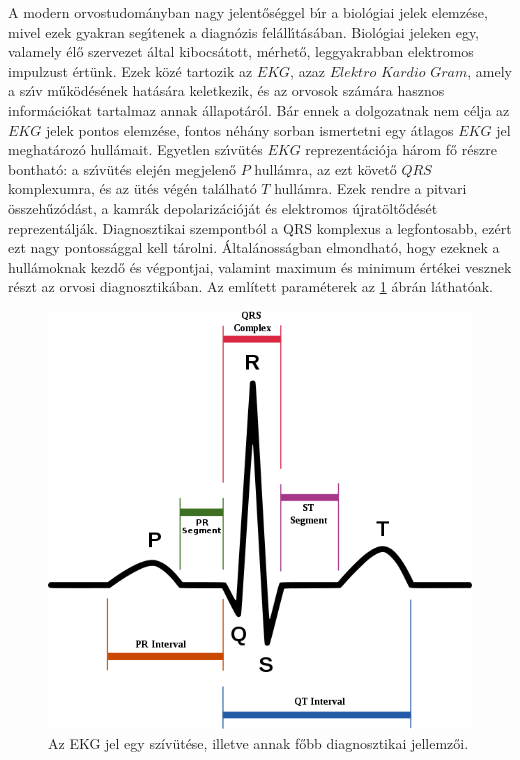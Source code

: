 \documentclass[oneside,titlepage,12pt,a4paper]{report}
\begin{document}
A modern orvostudom\'anyban nagy jelent\H os\'eggel b\'\i r a  biol\'ogiai jelek
elemz\'ese, mivel ezek gyakran seg\'\i tenek a diagn\'ozis fel\'all\'\i t\'as\'aban. Biol\'ogiai
jeleken egy, valamely \'el\H o szervezet \'altal kibocs\'atott, m\'erhet\H o, leggyakrabban elektromos
impulzust \'ert\"unk. Ezek k\"oz\'e tartozik az $EKG$, azaz $Elektro$ $Kardio$ $Gram$,
amely a sz\'\i v m\H uk\"od\'es\'e\-nek hat\'as\'ara keletkezik, \'es az orvosok sz\'am\'ara hasznos inform\'aci\'okat tartalmaz annak \'allapo\-t\'ar\'ol. B\'ar ennek a dolgozatnak nem c\'elja az $EKG$ jelek pontos elemz\'ese, fontos n\'eh\'any sorban ismertetni egy \'atlagos $EKG$ jel meghat\'aroz\'o hull\'amait. Egyetlen sz\'\i v\"ut\'es  $EKG$ reprezent\'aci\'oja h\'arom f\H o r\'eszre bonthat\'o: a sz\'\i v\"ut\'es elej\'en megjelen\H o $P$ hull\'amra, az ezt k\"ovet\H o $QRS$ komplexumra, \'es az \"ut\'es v\'eg\'en tal\'alhat\'o $T$ hull\'amra. Ezek rendre a pitvari összehűzódást, a kamrák depolarizációját és elektromos újratöltődését reprezentálják. Diagnosztikai szempontb\'ol a QRS komplexus a legfontosabb, ezért ezt nagy pontossággal kell tárolni. Általánosságban elmondható, hogy ezeknek a hullámoknak kezd\H o \'es v\'egpontjai, valamint maximum \'es minimum \'ert\'ekei vesznek részt az orvosi diagnosztikában. Az említett paraméterek az \ref{fig:ekg} ábrán láthatóak.
\begin{figure}[htb!]
\begin{center}
   \includegraphics[scale=0.37]{./Abrak/Egyeb/ecg_wiki.png}
   \caption{Az EKG jel egy szívütése, illetve annak főbb diagnosztikai jellemzői.}
		\label{fig:ekg}
\end{center}
\end{figure}
\end{document}
